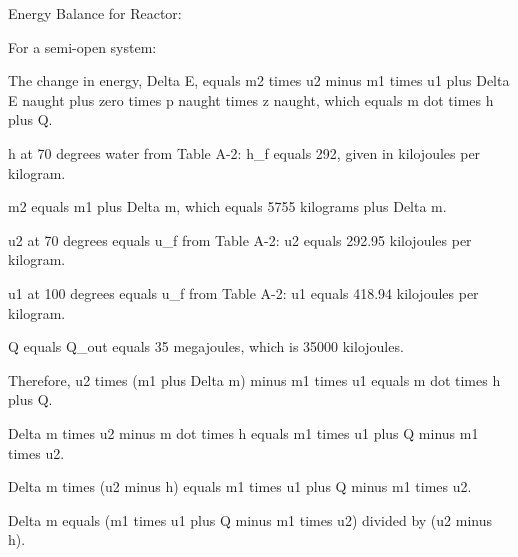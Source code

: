 Energy Balance for Reactor:

For a semi-open system:

The change in energy, Delta E, equals m2 times u2 minus m1 times u1 plus Delta E naught plus zero times p naught times z naught, which equals m dot times h plus Q.

h at 70 degrees water from Table A-2: h_f equals 292, given in kilojoules per kilogram.

m2 equals m1 plus Delta m, which equals 5755 kilograms plus Delta m.

u2 at 70 degrees equals u_f from Table A-2: u2 equals 292.95 kilojoules per kilogram.

u1 at 100 degrees equals u_f from Table A-2: u1 equals 418.94 kilojoules per kilogram.

Q equals Q_out equals 35 megajoules, which is 35000 kilojoules.

Therefore, u2 times (m1 plus Delta m) minus m1 times u1 equals m dot times h plus Q.

Delta m times u2 minus m dot times h equals m1 times u1 plus Q minus m1 times u2.

Delta m times (u2 minus h) equals m1 times u1 plus Q minus m1 times u2.

Delta m equals (m1 times u1 plus Q minus m1 times u2) divided by (u2 minus h).